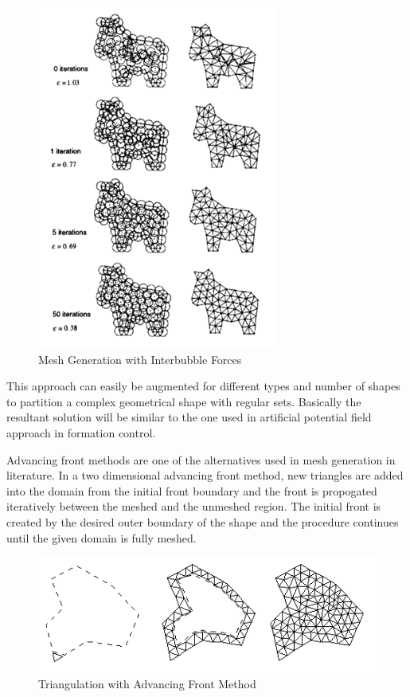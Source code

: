\begin{figure}[H]
	\caption{Mesh Generation with Interbubble Forces}
	\centering
	\includegraphics[scale = 1]{interbubble2}
\end{figure}

This approach can easily be augmented for different types and number of shapes to partition a complex geometrical shape with regular sets. Basically the resultant solution will be similar to the one used in artificial potential field approach in formation control. 

Advancing front methods are one of the alternatives used in mesh generation in literature.  In a two dimensional advancing front method, new triangles are added into the domain from the initial front boundary and the front is propogated iteratively between the meshed and the unmeshed region. The initial front is created by the desired outer boundary of the shape and the procedure continues until the given domain is fully meshed. 


\begin{figure}[H]
	\caption{Triangulation with Advancing Front Method}
	\centering
	\includegraphics[scale = 1]{advancing}
\end{figure}

